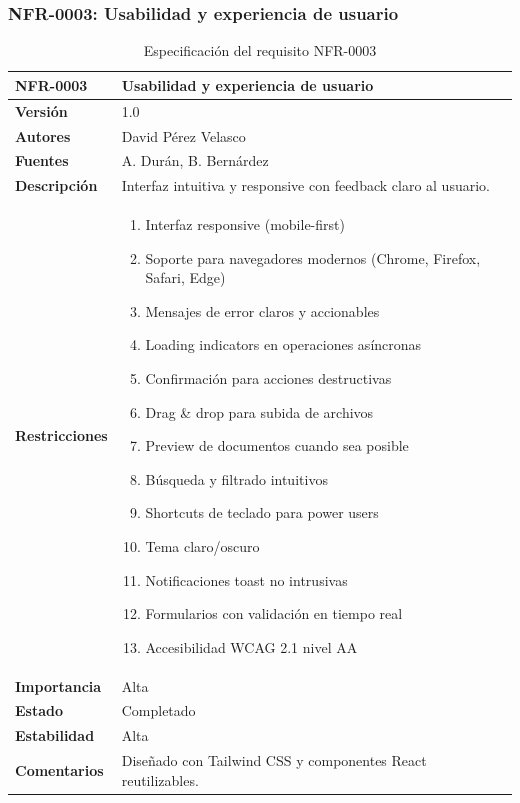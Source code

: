 \documentclass[11pt, a4paper]{article}
\begin{document}
\subsubsection{NFR-0003: Usabilidad y experiencia de usuario}

\begin{table}[H]
    \centering
    \small
    \begin{tabular}{|p{4cm}|p{10cm}|}
    \hline
    \textbf{NFR-0003} & Usabilidad y experiencia de usuario \\
    \hline
    \textbf{Versión} & 1.0 \\
    \hline
    \textbf{Autores} & David Pérez Velasco \\
    \hline
    \textbf{Fuentes} & A. Durán, B. Bernárdez \\
    \hline
    \textbf{Descripción} & Interfaz intuitiva y responsive con feedback claro al usuario. \\
    \hline
    \textbf{Restricciones} & 
    \begin{enumerate}
        \item Interfaz responsive (mobile-first)
        \item Soporte para navegadores modernos (Chrome, Firefox, Safari, Edge)
        \item Mensajes de error claros y accionables
        \item Loading indicators en operaciones asíncronas
        \item Confirmación para acciones destructivas
        \item Drag \& drop para subida de archivos
        \item Preview de documentos cuando sea posible
        \item Búsqueda y filtrado intuitivos
        \item Shortcuts de teclado para power users
        \item Tema claro/oscuro
        \item Notificaciones toast no intrusivas
        \item Formularios con validación en tiempo real
        \item Accesibilidad WCAG 2.1 nivel AA
    \end{enumerate} \\
    \hline
    \textbf{Importancia} & Alta \\
    \hline
    \textbf{Estado} & Completado \\
    \hline
    \textbf{Estabilidad} & Alta \\
    \hline
    \textbf{Comentarios} & Diseñado con Tailwind CSS y componentes React reutilizables. \\
    \hline
    \end{tabular}
    \caption{Especificación del requisito NFR-0003}
\end{table}
\end{document}
